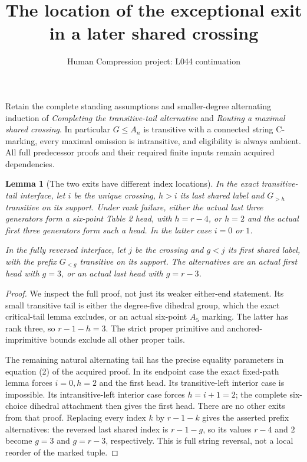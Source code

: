 \documentclass[11pt,a4paper]{article}
\title{The location of the exceptional exit in a later shared crossing}
\author{Human Compression project: L044 continuation}
\date{}
\newtheorem{lemma}{Lemma}
\begin{document}
\maketitle
Retain the complete standing assumptions and smaller-degree alternating
induction of \emph{Completing the transitive-tail alternative} and
\emph{Routing a maximal shared crossing}. In particular $G\le A_n$
is transitive with a connected string C-marking, every maximal
omission is intransitive, and eligibility is always ambient.
All full predecessor proofs and their required finite inputs remain
acquired dependencies.

\begin{lemma}[The two exits have different index locations]\label{location}
In the exact transitive-tail interface, let $i$ be the unique crossing,
$h>i$ its last shared label and $G_{>h}$ transitive on its support.
Under rank failure, either the actual last three generators form a
six-point Table 2 head, with $h=r-4$, or $h=2$ and the actual first
three generators form such a head. In the latter case $i=0$ or $1$.

In the fully reversed interface, let $j$ be the crossing and $g<j$
its first shared label, with the prefix $G_{<g}$ transitive on its
support. The alternatives are an actual first head with $g=3$, or
an actual last head with $g=r-3$.
\end{lemma}
\begin{proof}
We inspect the full proof, not just its weaker either-end statement.
Its small transitive tail is either the degree-five dihedral group,
which the exact critical-tail lemma excludes, or an actual six-point
$A_5$ marking. The latter has rank three, so $r-1-h=3$.
The strict proper primitive and anchored-imprimitive bounds exclude
all other proper tails.

The remaining natural alternating tail has the precise equality
parameters in equation (2) of the acquired proof. In its endpoint
case the exact fixed-path lemma forces $i=0,h=2$ and the first
head. Its transitive-left interior case is impossible. Its
intransitive-left interior case forces $h=i+1=2$; the complete
six-choice dihedral attachment then gives the first head.
There are no other exits from that proof. Replacing every index
$k$ by $r-1-k$ gives the asserted prefix alternatives: the reversed
last shared index is $r-1-g$, so its values $r-4$ and $2$ become
$g=3$ and $g=r-3$, respectively. This is full string reversal,
not a local reorder of the marked tuple.
\end{proof}
\end{document}
